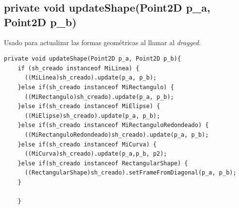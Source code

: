 \subsection*{private void updateShape(Point2D p\_a, Point2D p\_b)}
Usado para actualizar las formas geométricas al llamar al \emph{dragged}.
\begin{lstlisting}
private void updateShape(Point2D p_a, Point2D p_b){
    if (sh_creado instanceof MiLinea) {        
      ((MiLinea)sh_creado).update(p_a, p_b);
    }else if(sh_creado instanceof MiRectangulo) {
      ((MiRectangulo)sh_creado).update(p_a, p_b);
    }else if(sh_creado instanceof MiElipse) {
      ((MiElipse)sh_creado).update(p_a, p_b);
    }else if(sh_creado instanceof MiRectanguloRedondeado) {
      ((MiRectanguloRedondeado)sh_creado).update(p_a, p_b);  
    }else if(sh_creado instanceof MiCurva) {
      ((MiCurva)sh_creado).update(p_a,p_b, p2);    
    }else if(sh_creado instanceof RectangularShape) {
      ((RectangularShape)sh_creado).setFrameFromDiagonal(p_a, p_b);
    }
 
    }
\end{lstlisting}

